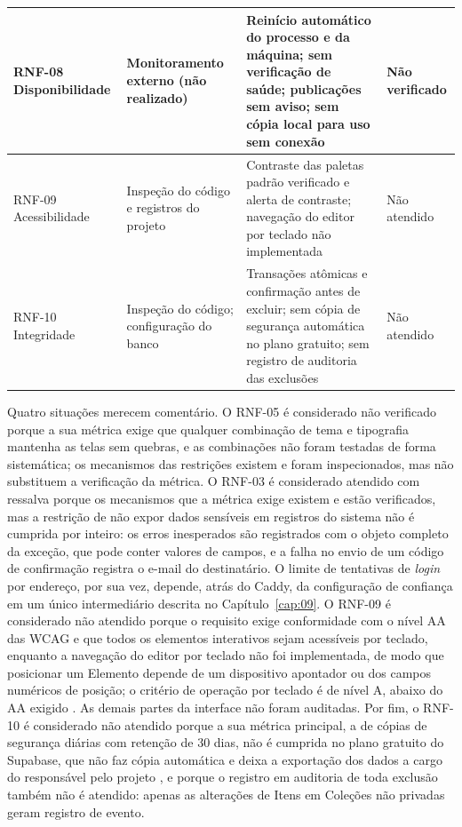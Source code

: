 \begin{quadro}[h!]
\begin{tabular}{|p{2.3cm}|p{3.3cm}|p{5.7cm}|p{2.2cm}|}
RNF-08 Disponibilidade & Monitoramento externo (não realizado) & Reinício automático do processo e da máquina; sem verificação de saúde; publicações sem aviso; sem cópia local para uso sem conexão & Não verificado \\ \hline
RNF-09 Acessibilidade & Inspeção do código e registros do projeto & Contraste das paletas padrão verificado e alerta de contraste; navegação do editor por teclado não implementada & Não atendido \\ \hline
RNF-10 Integridade & Inspeção do código; configuração do banco & Transações atômicas e confirmação antes de excluir; sem cópia de segurança automática no plano gratuito; sem registro de auditoria das exclusões & Não atendido \\ \hline
\end{tabular}
\end{quadro}
\FloatBarrier

Quatro situações merecem comentário. O RNF-05 é considerado não verificado porque a sua métrica exige que qualquer combinação de tema e tipografia mantenha as telas sem quebras, e as combinações não foram testadas de forma sistemática; os mecanismos das restrições existem e foram inspecionados, mas não substituem a verificação da métrica. O RNF-03 é considerado atendido com ressalva porque os mecanismos que a métrica exige existem e estão verificados, mas a restrição de não expor dados sensíveis em registros do sistema não é cumprida por inteiro: os erros inesperados são registrados com o objeto completo da exceção, que pode conter valores de campos, e a falha no envio de um código de confirmação registra o e-mail do destinatário. O limite de tentativas de \textit{login} por endereço, por sua vez, depende, atrás do Caddy, da configuração de confiança em um único intermediário descrita no Capítulo~\ref{cap:09}.
O RNF-09 é considerado não atendido porque o requisito exige conformidade com o nível AA das WCAG e que todos os elementos interativos sejam acessíveis por teclado, enquanto a navegação do editor por teclado não foi implementada, de modo que posicionar um Elemento depende de um dispositivo apontador ou dos campos numéricos de posição; o critério de operação por teclado é de nível A, abaixo do AA exigido \cite{campbell2024wcag}. As demais partes da interface não foram auditadas. Por fim, o RNF-10 é considerado não atendido porque a sua métrica principal, a de cópias de segurança diárias com retenção de 30 dias, não é cumprida no plano gratuito do Supabase, que não faz cópia automática e deixa a exportação dos dados a cargo do responsável pelo projeto \cite{supabase2026backups}, e porque o registro em auditoria de toda exclusão também não é atendido: apenas as alterações de Itens em Coleções não privadas geram registro de evento.

